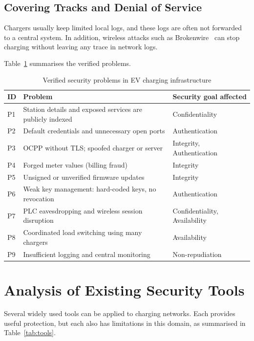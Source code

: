 \documentclass[runningheads]{llncs}
\begin{document}
\subsection{Covering Tracks and Denial of Service}
Chargers usually keep limited local logs, and these logs are often not forwarded to a central system. In addition, wireless attacks such as Brokenwire~\cite{kohler2023brokenwire} can stop charging without leaving any trace in network logs.

Table~\ref{tab:problems} summarises the verified problems.

\begin{table}[t]
\centering
\caption{Verified security problems in EV charging infrastructure}
\label{tab:problems}
\footnotesize
\begin{tabularx}{\textwidth}{@{}l X l@{}}
\toprule
\textbf{ID} & \textbf{Problem} & \textbf{Security goal affected}\\
\midrule
P1 & Station details and exposed services are publicly indexed & Confidentiality \\
P2 & Default credentials and unnecessary open ports & Authentication \\
P3 & OCPP without TLS; spoofed charger or server & Integrity, Authentication\\
P4 & Forged meter values (billing fraud) & Integrity \\
P5 & Unsigned or unverified firmware updates & Integrity \\
P6 & Weak key management: hard-coded keys, no revocation & Authentication \\
P7 & PLC eavesdropping and wireless session disruption & Confidentiality, Availability \\
P8 & Coordinated load switching using many chargers & Availability \\
P9 & Insufficient logging and central monitoring & Non-repudiation \\
\bottomrule
\end{tabularx}
\end{table}

\section{Analysis of Existing Security Tools}
Several widely used tools can be applied to charging networks. Each provides useful protection, but each also has limitations in this domain, as summarised in Table~\ref{tab:tools}.
\end{document}
